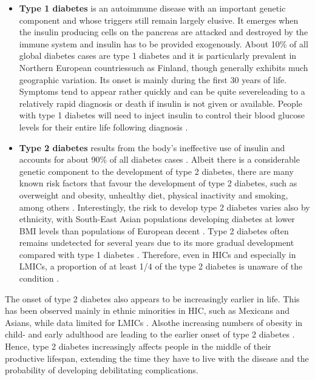 \begin{itemize}
\item \textbf{Type 1 diabetes} is an autoimmune disease with an important genetic component and whose triggers still remain largely elusive. It emerges when the insulin producing cells on the pancreas are attacked and destroyed by the immune system and insulin has to be provided exogenously. About 10\% of all global diabetes cases are type 1 diabetes and it is particularly prevalent in Northern European countries\DIFaddbegin \DIFadd{, }\DIFaddend such as Finland, though \DIFaddbegin {}\DIFaddend generally exhibits much geographic variation. Its onset is mainly during the first 30 years of life. Symptoms tend to appear rather quickly and can be quite severe\DIFaddbegin \DIFadd{, }\DIFaddend leading to a relatively rapid diagnosis or death \DIFdelbegin \DIFdel{, }\DIFdelend if insulin is not given or available. People with type 1 diabetes will need to inject insulin to control their blood glucose levels for their entire life following diagnosis \parencite{Tuomilehto2013}. 
\item \textbf{Type 2 diabetes} results from the body's ineffective use of insulin and accounts for about 90\% of all diabetes cases \parencite{WorldHealthOrganization2016}. Albeit there is a considerable genetic component to the development of type 2 diabetes, there are many known risk factors that favour the development of type 2 diabetes, such as overweight and obesity, \DIFaddbegin {}\DIFaddend unhealthy diet, physical inactivity and smoking, among others \parencite{WorldHealthOrganization2016, AmericanDiabetesAssociation2014}. Interestingly, the risk to develop type 2 diabetes varies also by ethnicity, with South-East Asian populations developing diabetes at lower \ac{BMI} levels than populations of European decent \parencite{Ramachandran2010}. Type 2 diabetes often remains undetected for several years due to its more gradual development compared with type 1 diabetes \parencite{AmericanDiabetesAssociation2014}. Therefore, even in \acp{HIC} and especially in \acp{LMIC}, a proportion of at least 1/4 of the \DIFaddbegin {}\DIFaddend type 2 diabetes \DIFdelbegin {}\DIFdelend is unaware of the condition \parencite{Beagley2014}. 
\end{itemize}

The onset of type 2 diabetes also appears to be increasingly earlier in life. This has been observed mainly in ethnic minorities in \acs{HIC}, such as Mexicans and Asians, while data \DIFdelbegin {}\DIFdelend \DIFaddbegin {}\DIFaddend limited for \acp{LMIC} \parencite{FazeliFarsani2013}. Also\DIFaddbegin \DIFadd{, }\DIFaddend the increasing numbers of obesity in child- and early adulthood are leading to the earlier onset of type 2 diabetes \parencite{Chen2012}. Hence, type 2 diabetes increasingly affects people in the middle of their productive lifespan, extending the time they have to live with the disease and the probability of developing debilitating complications.

